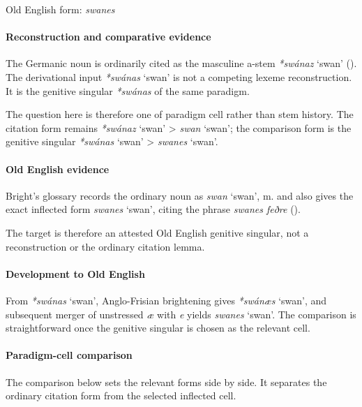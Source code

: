 \documentclass[
  british,
  a4paper,
]{article}
\providecommand{\Recon}[1]{\emph{*#1}}
\begin{document}
Old English form: \emph{swanes}

\paragraph{Reconstruction and comparative
evidence}\label{reconstruction-and-comparative-evidence-107}

The Germanic noun is ordinarily cited as the masculine a-stem
\Recon{swánaz} `swan' (). The
derivational input \Recon{swánas} `swan' is not a competing lexeme
reconstruction. It is the genitive singular \Recon{swánas} of the same
paradigm.

The question here is therefore one of paradigm cell rather than stem
history. The citation form remains \Recon{swánaz} `swan' \textgreater{}
{\emph{swan}} `swan'; the comparison form is the genitive singular
\Recon{swánas} `swan' \textgreater{} {\emph{swanes}} `swan'.

\paragraph{Old English evidence}\label{old-english-evidence-107}

Bright's glossary records the ordinary noun as {\emph{swan}} `swan', m.
and also gives the exact inflected form {\emph{swanes}} `swan', citing
the phrase \emph{swanes feðre}
().

The target is therefore an attested Old English genitive singular, not a
reconstruction or the ordinary citation lemma.

\paragraph{Development to Old
English}\label{development-to-old-english-107}

From \Recon{swánas} `swan', Anglo-Frisian brightening gives
\Recon{swánæs} `swan', and subsequent merger of unstressed \emph{æ} with
\emph{e} yields \emph{swanes} `swan'. The comparison is straightforward
once the genitive singular is chosen as the relevant cell.

\paragraph{Paradigm-cell comparison}\label{paradigm-cell-comparison}

The comparison below sets the relevant forms side by side. It separates
the ordinary citation form from the selected inflected cell.
\end{document}
